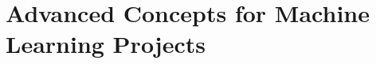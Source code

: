 \chapter{Advanced Concepts for Machine Learning Projects\label{Advanced Concepts for Machine Learning Projects}}